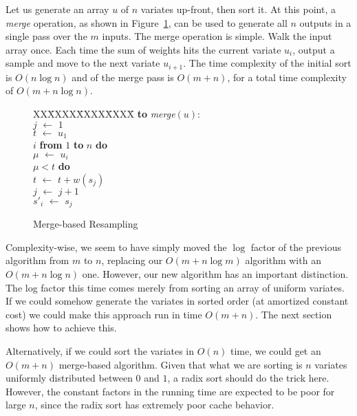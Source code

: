 \documentclass[12pt]{article}
\newcommand{\asgn}{\,\,\leftarrow\,\,}
\begin{document}
  Let us generate an array $u$ of $n$ variates up-front,
  then sort it.  At this point, a {\em merge} operation, as
  shown in Figure~\ref{fig-merge}, can be used to generate
  all $n$ outputs in a single pass over the $m$ inputs.  The
  merge operation is simple.  Walk the input array once.
  Each time the sum of weights hits the current variate
  $u_i$, output a sample and move to the next variate
  $u_{i+1}$.  The time complexity of the initial sort is
  $O(n \log n)$ and of the merge pass is $O(m + n)$, for a
  total time complexity of $O(m + n \log n)$.

  \begin{figure}
    \centering
    \begin{minipage}{0.6\textwidth}
      \begin{tabbing}
      XX\=XXXX\=XXXX\=XXXX\=\kill
      {\bf to} {\it merge}$(u)$: \\
      \>$j \asgn 1$ \\
      \>$t \asgn u_1$ \\
       $i$ {\bf from} $1$ {\bf to} $n$ {\bf do} \\
      \>\>$\mu \asgn u_i$ \\
      \> $\mu < t$ {\bf do} \\
      \>\>\>$t \asgn t + w(s_j)$ \\
      \>\>\>$j \asgn j + 1$ \\
      \>\>$s'_i \asgn s_j$
    \end{tabbing}
    \end{minipage}
    \caption{Merge-based Resampling}\label{fig-merge}
  \end{figure}

  Complexity-wise, we seem to have simply moved the $\log$
  factor of the previous algorithm from $m$ to $n$,
  replacing our $O(m + n \log m)$ algorithm with an $O(m + n
  \log n)$ one.  However, our new algorithm has an important
  distinction.  The log factor this time comes merely from
  sorting an array of uniform variates.  If we could somehow
  generate the variates in sorted order (at amortized
  constant cost) we could make this approach run in time
  $O(m + n)$.  The next section shows how to achieve this.

  Alternatively, if we could sort the variates in $O(n)$
  time, we could get an $O(m + n)$ merge-based algorithm.
  Given that what we are sorting is $n$ variates uniformly
  distributed between $0$ and $1$, a radix sort should do
  the trick here.  However, the constant factors in the running
  time are expected to be poor for large $n$, since the
  radix sort has extremely poor cache behavior.
\end{document}
